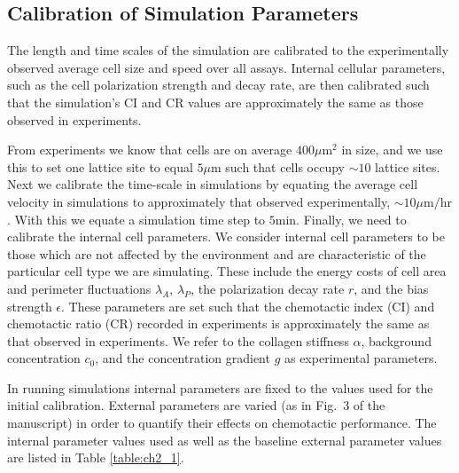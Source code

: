 \subsection{Calibration of Simulation Parameters}

The length and time scales of the simulation are calibrated to the experimentally observed average cell size and speed over all assays. Internal cellular parameters, such as the cell polarization strength and decay rate, are then calibrated such that the simulation's CI and CR values are approximately the same as those observed in experiments.

From experiments we know that cells are on average $400 \mu\text{m}^2$ in size, and we use this to set one lattice site to equal $5 \mu\text{m}$ such that cells occupy $\sim 10$ lattice sites. Next we calibrate the time-scale in simulations by equating the average cell velocity in simulations to approximately that observed experimentally, $\sim 10 \mu\text{m/hr}$. With this we equate a simulation time step to $5 \text{min}$. Finally, we need to calibrate the internal cell parameters. We consider internal cell parameters to be those which are not affected by the environment and are characteristic of the particular cell type we are simulating.
These include the energy costs of cell area and perimeter fluctuations $\lambda_A$, $\lambda_P$, the polarization decay rate $r$, and the bias strength $\epsilon$. These parameters are set such that the chemotactic index (CI) and chemotactic ratio (CR) recorded in experiments is approximately the same as that observed in experiments. We refer to the collagen stiffness $\alpha$, background concentration $c_0$, and the concentration gradient $g$ as experimental parameters.

In running simulations internal parameters are fixed to the values used for the initial calibration. External parameters are varied (as in Fig.\ 3 of the manuscript) in order to quantify their effects on chemotactic performance. The internal parameter values used as well as the baseline external parameter values are listed in Table \ref{table:ch2_1}.


